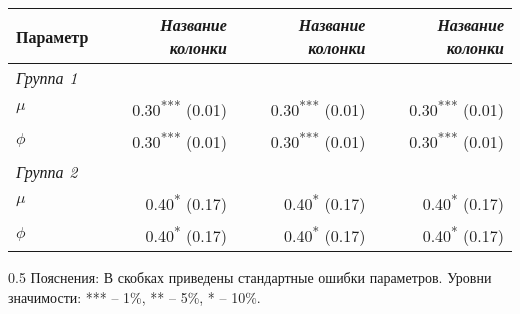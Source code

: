 \begin{table*}[!h]
\caption{Пример более сложной таблицы, содержащей оценки параметров модели.}
\label{tab:}
\setlength{\arrayrulewidth}{1.05 pt}
\renewcommand{\arraystretch}{1.1}
\begin{tabular*}{1.0\textwidth}{@{\extracolsep{\fill}}lrrr}
\hline
Параметр & \textit{Название колонки} & \textit{Название колонки} & \textit{Название колонки} \\
\hline

\multicolumn{4}{l}{\textit{Группа 1}} \\
$\mu$ & 0.30\textsuperscript{***} {\footnotesize (0.01)} & 0.30\textsuperscript{***} {\footnotesize (0.01)} & 0.30\textsuperscript{***} {\footnotesize (0.01)} \\
$\phi$ & 0.30\textsuperscript{***} {\footnotesize (0.01)} & 0.30\textsuperscript{***} {\footnotesize (0.01)} & 0.30\textsuperscript{***} {\footnotesize (0.01)} \\

\multicolumn{4}{l}{\textit{Группа 2}} \\
$\mu$ & 0.40\textsuperscript{*} {\footnotesize (0.17)} & 0.40\textsuperscript{*} {\footnotesize (0.17)} & 0.40\textsuperscript{*} {\footnotesize (0.17)} \\
$\phi$ & 0.40\textsuperscript{*} {\footnotesize (0.17)} & 0.40\textsuperscript{*} {\footnotesize (0.17)} & 0.40\textsuperscript{*} {\footnotesize (0.17)} \\

\hline
\end{tabular*}
\begin{spacing}{0.5}
{\scriptsize Пояснения: В скобках приведены стандартные ошибки параметров. Уровни значимости: *** -- 1\%, ** -- 5\%, * -- 10\%.}
\end{spacing}
\end{table*}

